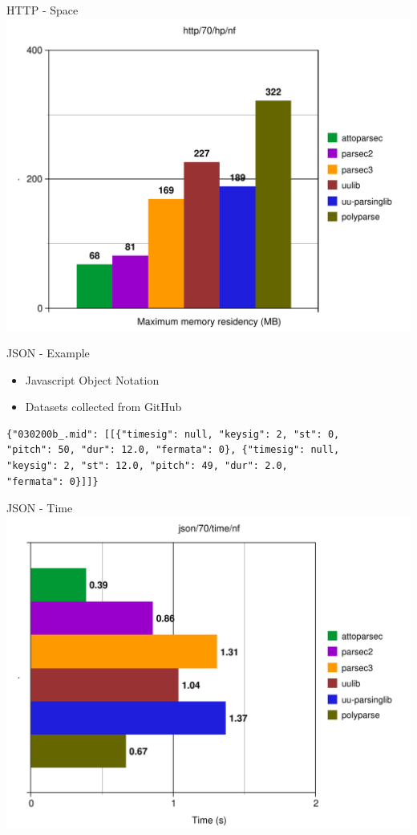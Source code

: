 \documentclass{beamer}
\begin{document}
\begin{frame}{HTTP - Space}
\includegraphics[scale=0.5]{presentation/http-70-hp-nf.pdf}
\end{frame}

\begin{frame}[fragile]{JSON - Example}
\begin{itemize}
\item Javascript Object Notation
\item Datasets collected from GitHub
\end{itemize}

\begin{verbatim}
{"030200b_.mid": [[{"timesig": null, "keysig": 2, "st": 0, 
"pitch": 50, "dur": 12.0, "fermata": 0}, {"timesig": null, 
"keysig": 2, "st": 12.0, "pitch": 49, "dur": 2.0, 
"fermata": 0}]]}
\end{verbatim}
\end{frame}

\begin{frame}{JSON - Time}
\includegraphics[scale=0.5]{presentation/json-70-time-nf.pdf}
\end{frame}
\end{document}
